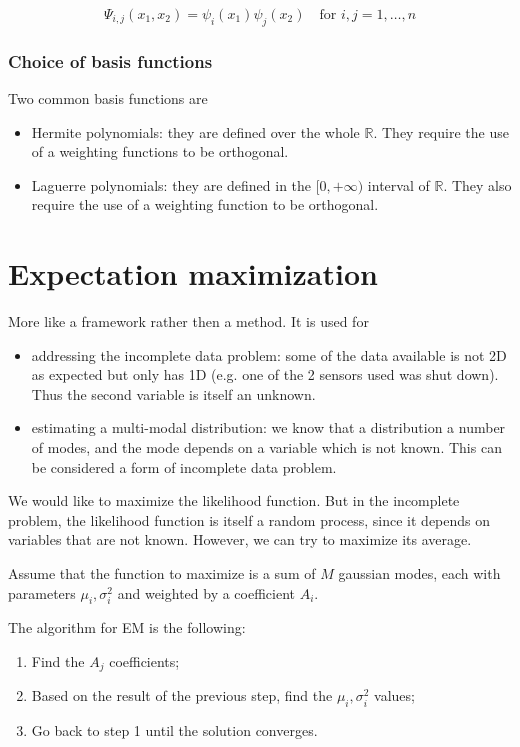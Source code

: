 \documentclass[oneside,onecolumn]{report}
\begin{document}
$$ \Psi_{i, j}(x_1, x_2) = \psi_i(x_1) \psi_j(x_2) \quad \text{for } i, j = 1, \dots, n $$

\subsubsection{Choice of basis functions}
Two common basis functions are
\begin{itemize}
    \item Hermite polynomials: they are defined over the whole $\mathbb R$.
    They require the use of a weighting functions to be orthogonal.

    \item Laguerre polynomials: they are defined in the $[0, +\infty)$ interval of $\mathbb R$.
    They also require the use of a weighting function to be orthogonal.
\end{itemize}


\section{Expectation maximization}
More like a framework rather then a method.
It is used for
\begin{itemize}
    \item addressing the incomplete data problem: some of the data available is not 2D as expected but only has 1D (e.g. one of the 2 sensors used was shut down). Thus the second variable is itself an unknown.
    \item estimating a multi-modal distribution: we know that a distribution a number of modes, and the mode depends on a variable which is not known. This can be considered a form of incomplete data problem.
\end{itemize}

We would like to maximize the likelihood function.
But in the incomplete problem, the likelihood function is itself a random process, since it depends on variables that are not known.
However, we can try to maximize its average.

Assume that the function to maximize is a sum of $M$ gaussian modes, each with parameters $\mu_i, \sigma_i^2$ and weighted by a coefficient $A_i$.

The algorithm for EM is the following:
\begin{enumerate}
    \item Find the $A_j$ coefficients;
    \item Based on the result of the previous step, find the $\mu_i, \sigma_i^2$ values;
    \item Go back to step 1 until the solution converges.
\end{enumerate}
\end{document}
